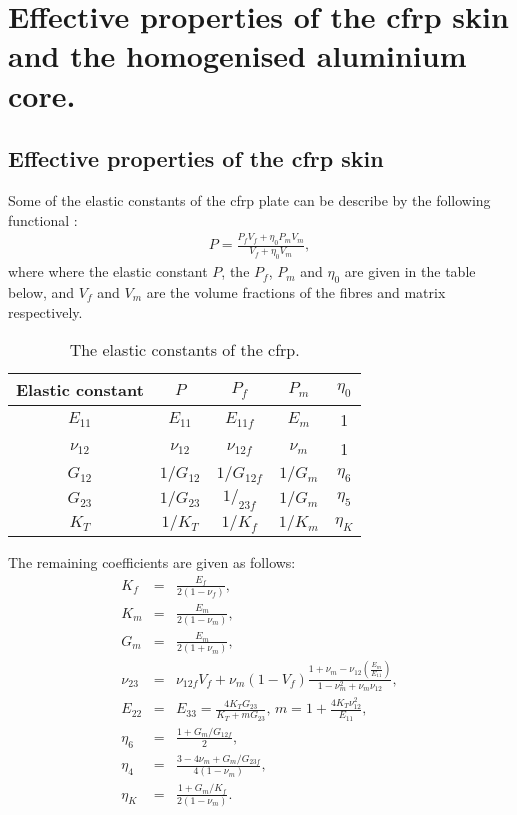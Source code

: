 
\chapter{Effective properties of the \acs{cfrp} skin and the homogenised aluminium core.}
\label{app:eff_properties}
\section{Effective properties of the \acs{cfrp} skin}
Some of the elastic constants of the \ac{cfrp} plate can be describe by the following functional \cite{vinson1993behavior}:
\begin{eqnarray}
	P=\frac{P_fV_f+\eta_0P_mV_m}{V_f+\eta_0V_m},
\end{eqnarray}
where where the elastic constant \(P\), the \(P_f\), \(P_m\) and \(\eta_0\) are given in the table below, and \(V_f\) and \(V_m\) are the volume fractions of the fibres and matrix respectively.
\begin{table}[H]
	\centering
	\small
	\caption{\label{tab:skin_eff} The elastic constants of the \ac{cfrp}.}
	\begin{tabular}{ccccc}
		\toprule
		Elastic constant & \(P\) & \(P_f\) & \(P_m\) & \(\eta_0\)\\
		\midrule
		 \(E_{11}\) & \(E_{11}\) & \(E_{11f}\) & \(E_{m}\) & 1\\
		 \(\nu_{12}\) & \(\nu_{12}\) & \(\nu_{12f}\) & \(\nu_{m}\) & 1\\
		 \(G_{12}\) & \(1/G_{12}\) & \(1/G_{12f}\) & \(1/G_{m}\) & \(\eta_6\)\\
		 \(G_{23}\) & \(1/G_{23}\) & \(1/_{23f}\) & \(1/G_{m}\) & \(\eta_5\)\\
		 \(K_{T}\) & \(1/K_{T}\) & \(1/K_{f}\) & \(1/K_{m}\) & \(\eta_K\)\\
		\bottomrule
	\end{tabular}
\end{table}
The remaining coefficients are given as follows:
\begin{eqnarray}
	K_f&=&\frac{E_f}{2(1-\nu_f)},\\
	K_m&=&\frac{E_m}{2(1-\nu_m)},\\
	G_m &=& \frac{E_m}{2(1+\nu_m)},\\
	\nu_{23} &=& \nu_{12f}V_f+\nu_m(1-V_f)\frac{1+\nu_m-\nu_{12}\left(\frac{E_m}{E_11}\right)}{1-\nu^2_m+\nu_m\nu_{12}},\\
	E_{22}&=&E_{33}=\frac{4K_TG_{23}}{K_T+mG_{23}},\, m=1+\frac{4K_T\nu^2_{12}}{E_11},\\
	\eta_6 &=& \frac{1+G_m/G_{12f}}{2},\\
	\eta_4 &=& \frac{3-4\nu_m+G_m/G_{23f}}{4\left(1-\nu_m\right)},\\
	\eta_K &=& \frac{1+G_m/K_{f}}{2\left(1-\nu_m\right)}.
\end{eqnarray}
